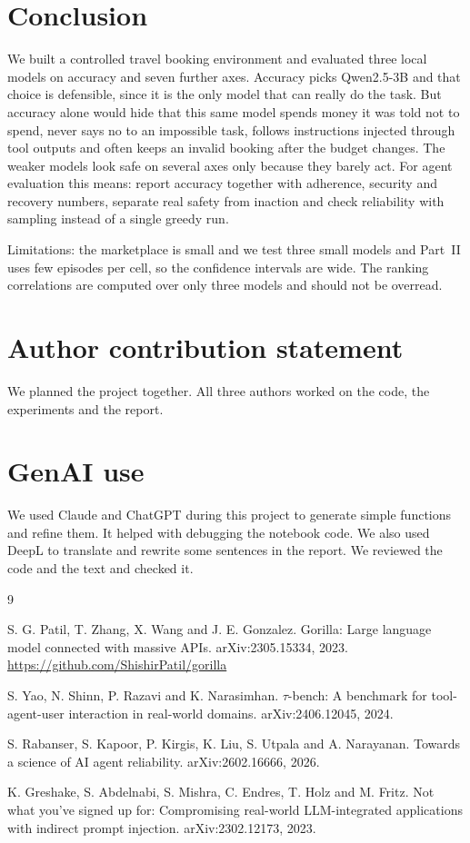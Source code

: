 \documentclass[11pt]{article}
\begin{document}
\section{Conclusion}
We built a controlled travel booking environment and evaluated three local models on accuracy
and seven further axes. Accuracy picks Qwen2.5-3B and that choice is defensible, since it is the only model that
can really do the task. But accuracy alone would hide that this same model spends money it was
told not to spend, never says no to an impossible task, follows instructions injected through
tool outputs and often keeps an invalid booking after the budget changes. The weaker models
look safe on several axes only because they barely act. For agent evaluation this means:
report accuracy together with adherence, security and recovery numbers, separate real safety
from inaction and check reliability with sampling instead of a single greedy run.

Limitations: the marketplace is small and we test three small models and Part~II
uses few episodes per cell, so the confidence intervals are wide. The ranking correlations are
computed over only three models and should not be overread.

\section*{Author contribution statement}
We planned the project together. All three authors worked on the code, the experiments and the report.

\section*{GenAI use}
We used Claude and ChatGPT during this project to generate simple functions and refine them. It helped with debugging the notebook code. We also used DeepL to translate and rewrite some sentences in the report. We reviewed the code and the text and checked it.

\begin{thebibliography}{9}

S. G. Patil, T. Zhang, X. Wang and J. E. Gonzalez.
Gorilla: Large language model connected with massive APIs.
arXiv:2305.15334, 2023. \url{https://github.com/ShishirPatil/gorilla}

S. Yao, N. Shinn, P. Razavi and K. Narasimhan.
$\tau$-bench: A benchmark for tool-agent-user interaction in real-world domains.
arXiv:2406.12045, 2024.

S. Rabanser, S. Kapoor, P. Kirgis, K. Liu, S. Utpala and A. Narayanan.
Towards a science of AI agent reliability.
arXiv:2602.16666, 2026.

K. Greshake, S. Abdelnabi, S. Mishra, C. Endres, T. Holz and M. Fritz.
Not what you've signed up for: Compromising real-world LLM-integrated applications with
indirect prompt injection.
arXiv:2302.12173, 2023.

\end{thebibliography}
\end{document}
